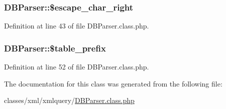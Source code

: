 \subsubsection[{\$escape\+\_\+char\+\_\+right}]{\setlength{\rightskip}{0pt plus 5cm}D\+B\+Parser\+::\$escape\+\_\+char\+\_\+right}\label{classDBParser_acb291f115d0e864a5a5774ebcf091eeb}


Definition at line 43 of file D\+B\+Parser.\+class.\+php.

\hypertarget{classDBParser_aecad815ff642d9c918e97747d638dbf0}{}
\subsubsection[{\$table\+\_\+prefix}]{\setlength{\rightskip}{0pt plus 5cm}D\+B\+Parser\+::\$table\+\_\+prefix}\label{classDBParser_aecad815ff642d9c918e97747d638dbf0}


Definition at line 52 of file D\+B\+Parser.\+class.\+php.



The documentation for this class was generated from the following file\+:\begin{DoxyCompactItemize}
\item 
classes/xml/xmlquery/\hyperlink{DBParser_8class_8php}{D\+B\+Parser.\+class.\+php}\end{DoxyCompactItemize}
